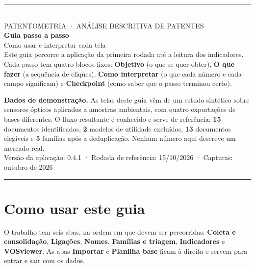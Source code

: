 \documentclass[11pt,a4paper]{article}
\renewenvironment{leftbar}{%
  \def\FrameCommand{{\color{accent}\vrule width 2.6pt}\hspace{10pt}}%
  \MakeFramed{\advance\hsize-\width\FrameRestore}}%
 {\endMakeFramed}
\newcommand{\num}[1]{\textsf{\textbf{#1}}}
\begin{document}
\begin{titlepage}
\thispagestyle{empty}
{\color{navy}\rule{\linewidth}{2.5pt}}\\[1.0cm]
{\sffamily\footnotesize\color{ink3}PATENTOMETRIA \; · \; ANÁLISE DESCRITIVA DE PATENTES}\\[0.35cm]
{\sffamily\bfseries\fontsize{31}{35}\selectfont\color{navy} Guia passo a passo}\\[0.35cm]
{\sffamily\Large\color{ink2} Como usar e interpretar cada tela}\\[1.4cm]

\begin{leftbar}
\small\color{ink2}
Este guia percorre a aplicação da primeira rodada até a leitura dos indicadores. Cada passo tem
quatro blocos fixos: \textbf{Objetivo} (o que se quer obter), \textbf{O que fazer} (a sequência de
cliques), \textbf{Como interpretar} (o que cada número e cada campo significam) e
\textbf{Checkpoint} (como saber que o passo terminou certo).
\end{leftbar}

\vspace{0.6cm}
{\sffamily\small\color{ink2}
\textbf{Dados de demonstração.} As telas deste guia vêm de um estudo sintético sobre sensores ópticos
aplicados a amostras ambientais, com quatro exportações de bases diferentes. O fluxo resultante é
conhecido e serve de referência: \num{15} documentos identificados, \num{2} modelos de utilidade
excluídos, \num{13} documentos elegíveis e \num{5} famílias após a deduplicação. Nenhum número aqui
descreve um mercado real.}\\[0.8cm]
{\sffamily\small\color{ink3}
Versão da aplicação: 0.4.1 \quad · \quad Rodada de referência: 15/10/2026 \quad · \quad
Capturas: outubro de 2026}\\[0.3cm]
{\color{navy}\rule{\linewidth}{0.8pt}}
\end{titlepage}

\section*{Como usar este guia}

O trabalho tem seis abas, na ordem em que devem ser percorridas: \textbf{Coleta e consolidação},
\textbf{Ligações}, \textbf{Nomes}, \textbf{Famílias e triagem}, \textbf{Indicadores} e
\textbf{VOSviewer}. As abas \textbf{Importar} e \textbf{Planilha base} ficam à direita e servem para
entrar e sair com os dados.
\end{document}
